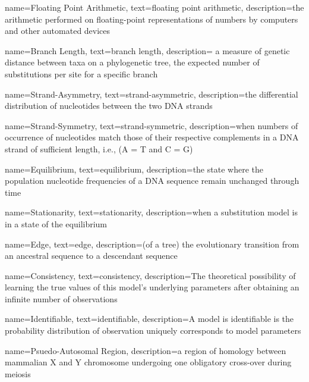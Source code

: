 \makeglossaries

{
        name=Floating Point Arithmetic,
        text=floating point arithmetic,
        description={the arithmetic performed on floating-point representations of numbers by computers and other automated devices}
}


{
        name=Branch Length,
        text=branch length,
        description={ a measure of genetic distance between taxa on a phylogenetic tree, the expected number of substitutions per site for a specific branch}
}


{
        name=Strand-Asymmetry,
        text={strand-asymmetric},
        description={the differential distribution of nucleotides between the two DNA strands}
}

{
        name=Strand-Symmetry,
        text=strand-symmetric,
        description={when numbers of occurrence of nucleotides match those of their respective complements in a DNA strand of sufficient length, i.e., (A = T and C = G)}
}


{
        name=Equilibrium,
        text=equilibrium,
        description={the state where the population nucleotide frequencies of a DNA sequence remain unchanged through time}
}

{
        name=Stationarity,
        text=stationarity,
        description={when a substitution model is in a state of the \gls{equilibrium}}
}


{
        name=Edge,
        text=edge,
        description={(of a tree) the evolutionary transition from an ancestral sequence to a descendant sequence}
}

{
        name=Consistency,
        text=consistency,
        description={The theoretical possibility of learning the true values of this model's underlying parameters after obtaining an infinite number of observations}
}

{
        name=Identifiable,
        text=identifiable,
        description={A model is identifiable is the probability distribution of observation uniquely corresponds to model parameters}
}


{
        name=Psuedo-Autosomal Region,
        description={a region of homology between mammalian X and Y chromosome undergoing one obligatory cross-over during meiosis}
}

